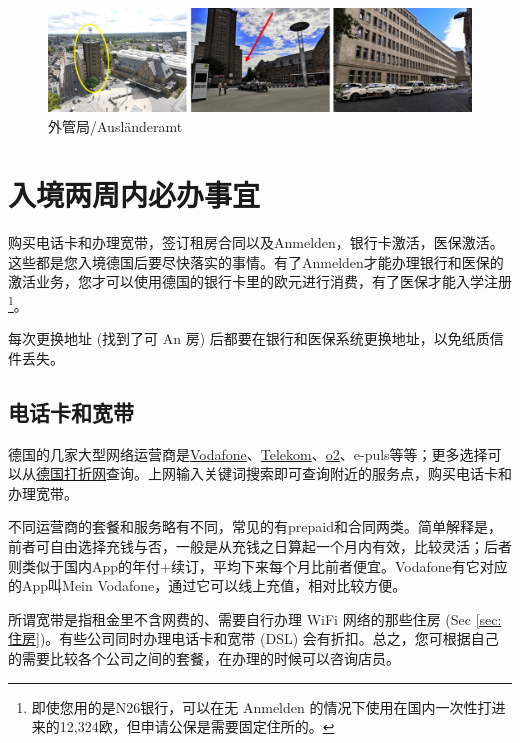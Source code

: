     \begin{figure}[ht]
      \centering
      \includegraphics[width=\textwidth]{初来乍到/Bürgerservice/外管局.png}
      \caption{外管局/Ausländeramt}
      \label{fig:外管局/Ausländeramt}
    \end{figure}

\section{入境两周内必办事宜}\label{sec:入境两周内必办事宜}

  购买电话卡和办理宽带，签订租房合同以及Anmelden，银行卡激活，医保激活。这些都是您入境德国后要尽快落实的事情。有了Anmelden才能办理银行和医保的激活业务，您才可以使用德国的银行卡里的欧元进行消费，有了医保才能入学注册\footnote{即使您用的是N26银行，可以在无 Anmelden 的情况下使用在国内一次性打进来的12,324欧，但申请公保是需要固定住所的。}。

  每次更换地址 (找到了可 An 房) 后都要在银行和医保系统更换地址，以免纸质信件丢失。

  \subsection{电话卡和宽带}\label{subsec:电话卡和宽带}

    德国的几家大型网络运营商是\href{https://www.vodafone-shops.de/aachen-203344151/}{Vodafone}、\href{https://shopseite.telekom.de/west/aachen/holzgraben-6}{Telekom}、\href{https://www.o2online.de/shops/aachen/3}{o2}、e-puls等等；更多选择可以从\href{https://www.dazhe.de/}{德国打折网}查询。上网输入关键词搜索即可查询附近的服务点，购买电话卡和办理宽带。

    不同运营商的套餐和服务略有不同，常见的有prepaid和合同两类。简单解释是，前者可自由选择充钱与否，一般是从充钱之日算起一个月内有效，比较灵活；后者则类似于国内App的年付+续订，平均下来每个月比前者便宜。Vodafone有它对应的App叫Mein Vodafone，通过它可以线上充值，相对比较方便。

    所谓宽带是指租金里不含网费的、需要自行办理 WiFi 网络的那些住房 (Sec \ref{sec:住房})。有些公司同时办理电话卡和宽带 (DSL) 会有折扣。总之，您可根据自己的需要比较各个公司之间的套餐，在办理的时候可以咨询店员。

